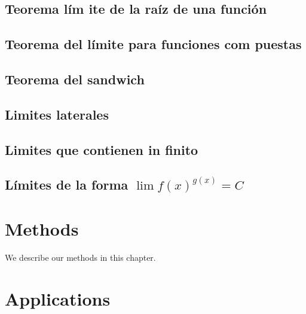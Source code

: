 \documentclass[12pt,]{report}
\theoremstyle{slplain}
\begin{document}
\hypertarget{teorema-luxedm-ite-de-la-rauxedz-de-una-funciuxf3n}{%
\section{Teorema lím ite de la raíz de una función}\label{teorema-luxedm-ite-de-la-rauxedz-de-una-funciuxf3n}}

\hypertarget{teorema-del-luxedmite-para-funciones-com-puestas}{%
\section{Teorema del límite para funciones com puestas}\label{teorema-del-luxedmite-para-funciones-com-puestas}}

\hypertarget{teorema-del-sandwich}{%
\section{Teorema del sandwich}\label{teorema-del-sandwich}}

\hypertarget{limites-laterales}{%
\section{Limites laterales}\label{limites-laterales}}

\hypertarget{limites-que-contienen-in-finito}{%
\section{Limites que contienen in finito}\label{limites-que-contienen-in-finito}}

\hypertarget{luxedmites-de-la-forma-lim-fxgxc}{%
\section{\texorpdfstring{Límites de la forma \(\lim f(x)^{g(x)}=C\)}{Límites de la forma \textbackslash{}lim f(x)\^{}\{g(x)\}=C}}\label{luxedmites-de-la-forma-lim-fxgxc}}

\hypertarget{methods}{%
\chapter{Methods}\label{methods}}

We describe our methods in this chapter.

\hypertarget{applications}{%
\chapter{Applications}\label{applications}}
\end{document}
